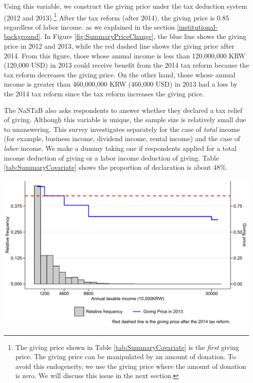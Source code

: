 \documentclass[
  11pt,
  a4paper,
]{article}
\begin{document}
Using this variable, we construct the giving price under the tax deduction system (2012 and 2013).\footnote{The giving price shown in Table \ref{tab:SummaryCovariate} is the \emph{first} giving price. The giving price can be manipulated by an amount of donation. To avoid this endogeneity, we use the giving price where the amount of donation is zero. We will discuss this issue in the next section.}
After the tax reform (after 2014), the giving price is 0.85 regardless of labor income.
as we explained in the section \ref{institutional-background}.
In Figure \ref{fig:SummaryPriceChange},
the blue line shows the giving price in 2012 and 2013,
while the red dashed line shows the giving price after 2014.
From this figure,
those whose annual income is less than 120,000,000 KRW (120,000 USD) in 2013 could receive benefit from the 2014 tax reform
because the tax reform decreases the giving price.
On the other hand,
those whose annual income is greater than 460,000,000 KRW (460,000 USD) in 2013 had a loss by the 2014 tax reform
since the tax reform increases the giving price.

The NaSTaB also asks respondents to answer whether they declared a tax relief of giving.
Although this variable is unique, the sample size is relatively small due to unanswering.
This survey investigates separately for the case of \emph{total} income (for example, business income, dividend income, rental income)
and the case of \emph{labor} income.
We make a dummy taking one if respondents applied for a total income deduction of giving
or a labor income deduction of giving.
Table \ref{tab:SummaryCovariate} shows the proportion of declaration is about 48\%.

\begin{center}\includegraphics[width=0.85\linewidth]{draft_files/figure-latex/SummaryPriceChange-1} \end{center}
\end{document}
